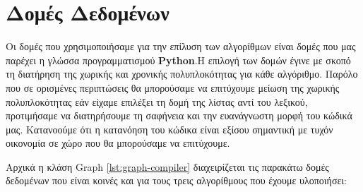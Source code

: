 \section{Δομές Δεδομένων}

Οι δομές που χρησιμοποιήσαμε για την επίλυση των αλγορίθμων είναι δομές που μας παρέχει η γλώσσα προγραμματισμού \textbf{Python}.Η επιλογή των δομών έγινε με σκοπό τη διατήρηση της χωρικής και χρονικής πολυπλοκότητας για κάθε αλγόριθμο. Παρόλο που σε ορισμένες περιπτώσεις θα μπορούσαμε να επιτύχουμε μείωση της χωρικής πολυπλοκότητας εάν είχαμε επιλέξει τη δομή της λίστας αντί του λεξικού, προτιμήσαμε να διατηρήσουμε τη σαφήνεια και την ευανάγνωστη μορφή του κώδικά μας. Κατανοούμε ότι η κατανόηση του κώδικα είναι εξίσου σημαντική με τυχόν οικονομία σε χώρο που θα μπορούσαμε να επιτύχουμε.

Αρχικά η κλάση Graph \ref{lst:graph-compiler} διαχειρίζεται τις παρακάτω δομές δεδομένων που είναι κοινές και για τους τρεις αλγορίθμους που έχουμε υλοποιήσει:

